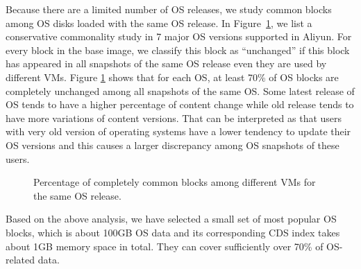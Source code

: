Because there are a limited number of OS releases, we study common blocks among
OS disks loaded with  the same OS release. 
In  Figure~\ref{fig:OSunchanged},  we list a conservative  commonality study in 7 major OS versions  supported
in Aliyun.
For every block in the base image, we classify this block as ``unchanged''
if this block has appeared in all snapshots of the same OS release even they are used by different VMs.
Figure \ref{fig:OSunchanged} shows that for each
OS,  at least 70\% of OS blocks are completely unchanged among all snapshots of the same OS. 
Some latest release  of OS tends to have a higher percentage of content change
while  old release tends to have more variations of content versions.
That can be interpreted as that users with very old  version of operating systems
have a lower tendency to update their OS versions and this causes a larger discrepancy
among OS snapshots of these users.


\begin{figure}
\centering
{}
\caption{Percentage of completely common blocks among different VMs for the same OS release.}
\label{fig:OSunchanged}
\end{figure}

Based on the above analysis, we have selected a small set of most popular
OS blocks, which is about 100GB OS data and its corresponding CDS index takes about 1GB memory space in total.
They can cover sufficiently over 70\% of OS-related data.

